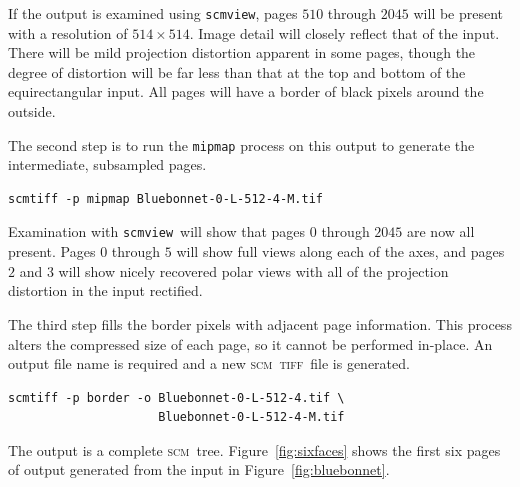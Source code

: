 \documentclass[oneside,10pt]{memoir}
\newcommand{\scm}     {\textsc{scm}}
\newcommand{\tiff}    {\textsc{tiff}}
\newcommand{\scmview} {\texttt{scmview}}
\begin{document}
\begin{Spacing}{1.1}
If the output is examined using \scmview, pages $510$ through $2045$ will be present with a resolution of $514\times 514$. Image detail will closely reflect that of the input. There will be mild projection distortion apparent in some pages, though the degree of distortion will be far less than that at the top and bottom of the equirectangular input. All pages will have a border of black pixels around the outside.

The second step is to run the \texttt{mipmap} process on this output to generate the intermediate, subsampled pages.

\begin{Verbatim}
scmtiff -p mipmap Bluebonnet-0-L-512-4-M.tif
\end{Verbatim}

Examination with \scmview\ will show that pages $0$ through $2045$ are now all present. Pages $0$ through $5$ will show full views along each of the axes, and pages $2$ and $3$ will show nicely recovered polar views with all of the projection distortion in the input rectified.

The third step fills the border pixels with adjacent page information. This process alters the compressed size of each page, so it cannot be performed in-place. An output file name is required and a new \scm\ \tiff\ file is generated.

\begin{Verbatim}
scmtiff -p border -o Bluebonnet-0-L-512-4.tif \
                     Bluebonnet-0-L-512-4-M.tif
\end{Verbatim}

The output is a complete \scm\ tree. Figure~\ref{fig:sixfaces} shows the first six pages of output generated from the input in Figure~\ref{fig:bluebonnet}.


\end{Spacing}
\end{document}
